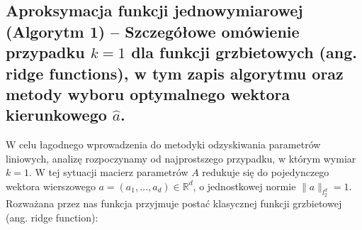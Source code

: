 \subsection{ Aproksymacja funkcji jednowymiarowej (Algorytm 1) – Szczegółowe omówienie przypadku $k=1$ dla funkcji grzbietowych (ang. ridge functions), w tym zapis algorytmu oraz metody wyboru optymalnego wektora kierunkowego $\hat{a}$.}

W celu łagodnego wprowadzenia do metodyki odzyskiwania parametrów liniowych, analizę rozpoczynamy od najprostszego przypadku, w którym wymiar $k=1$. W tej sytuacji macierz parametrów $A$ redukuje się do pojedynczego wektora wierszowego $a = (a_1, \dots, a_d) \in \mathbb{R}^d$, o jednostkowej normie $\|a\|_{l_2^d} = 1$. Rozważana przez nas funkcja przyjmuje postać klasycznej funkcji grzbietowej (ang. ridge function):

